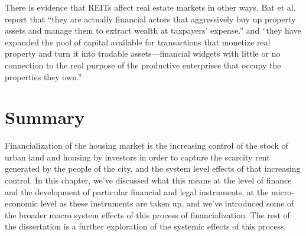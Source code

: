 There is evidence that REITs affect real estate markets in other ways. Bat et al.  \cite{batRolePublicREITs2022} report that  ``they are actually financial actors that aggressively buy up property assets and manage them to extract wealth at taxpayers' expense.'' and ``they have expanded the pool of capital available for transactions that monetize real property and turn it into tradable assets---financial widgets with little or no connection to the real purpose of the productive enterprises that occupy the properties they own.''

\section{Summary} 
Financialization of the housing market is the increasing control of the stock of urban land and housing by investors in order to capture the scarcity rent generated by the people of the city, and the system level effects of that increasing control.  In this chapter, we've discussed what this means at the level of finance and the development of particular financial and legal instruments, at the micro-economic level as these instruments are taken up, and we've introduced some of the broader macro system effects of this process of financialization. The rest of the dissertation is a further exploration of the systemic effects of this process. 





